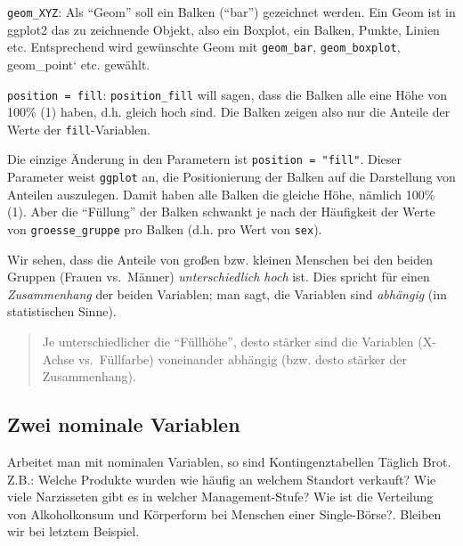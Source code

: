 \documentclass[12pt,ngerman,]{book}
\makeatletter
\newenvironment{Shaded}{\begin{snugshade}}{\end{snugshade}}
\newcommand{\KeywordTok}[1]{\textcolor[rgb]{0.13,0.29,0.53}{\textbf{{#1}}}}
\newcommand{\DataTypeTok}[1]{\textcolor[rgb]{0.13,0.29,0.53}{{#1}}}
\newcommand{\DecValTok}[1]{\textcolor[rgb]{0.00,0.00,0.81}{{#1}}}
\newcommand{\StringTok}[1]{\textcolor[rgb]{0.31,0.60,0.02}{{#1}}}
\newcommand{\NormalTok}[1]{{#1}}
\newenvironment{kframe}{%
\medskip{}
\setlength{\fboxsep}{.8em}
 \def\at@end@of@kframe{}%
 \ifinner\ifhmode%
  \def\at@end@of@kframe{\end{minipage}}%
  \begin{minipage}{\columnwidth}%
 \fi\fi%
 \def\FrameCommand##1{\hskip\@totalleftmargin \hskip-\fboxsep
 \colorbox{shadecolor}{##1}\hskip-\fboxsep
     \hskip-\linewidth \hskip-\@totalleftmargin \hskip\columnwidth}%
 \MakeFramed {\advance\hsize-\width
   \@totalleftmargin\z@ \linewidth\hsize
   \@setminipage}}%
 {\par\unskip\endMakeFramed%
 \at@end@of@kframe}
\renewenvironment{Shaded}{\begin{kframe}}{\end{kframe}}
\theoremstyle{definition}
\theoremstyle{definition}
\theoremstyle{remark}
\makeatother
\begin{document}
\texttt{geom\_XYZ}: Als ``Geom'' soll ein Balken (``bar'') gezeichnet
werden. Ein Geom ist in ggplot2 das zu zeichnende Objekt, also ein
Boxplot, ein Balken, Punkte, Linien etc. Entsprechend wird gewünschte
Geom mit \texttt{geom\_bar}, \texttt{geom\_boxplot}, geom\_point` etc.
gewählt.

\texttt{position\ =\ fill}: \texttt{position\_fill} will sagen, dass die
Balken alle eine Höhe von 100\% (1) haben, d.h. gleich hoch sind. Die
Balken zeigen also nur die Anteile der Werte der
\texttt{fill}-Variablen.

Die einzige Änderung in den Parametern ist \texttt{position\ =\ "fill"}.
Dieser Parameter weist \texttt{ggplot} an, die Positionierung der Balken
auf die Darstellung von Anteilen auszulegen. Damit haben alle Balken die
gleiche Höhe, nämlich 100\% (1). Aber die ``Füllung'' der Balken
schwankt je nach der Häufigkeit der Werte von \texttt{groesse\_gruppe}
pro Balken (d.h. pro Wert von \texttt{sex}).

Wir sehen, dass die Anteile von großen bzw. kleinen Menschen bei den
beiden Gruppen (Frauen vs.~Männer) \emph{unterschiedlich hoch} ist. Dies
spricht für einen \emph{Zusammenhang} der beiden Variablen; man sagt,
die Variablen sind \emph{abhängig} (im statistischen Sinne).

\begin{quote}
Je unterschiedlicher die ``Füllhöhe'', desto stärker sind die Variablen
(X-Achse vs.~Füllfarbe) voneinander abhängig (bzw. desto stärker der
Zusammenhang).
\end{quote}

\subsection{Zwei nominale Variablen}\label{zwei-nominale-variablen}

Arbeitet man mit nominalen Variablen, so sind Kontingenztabellen Täglich
Brot. Z.B.: Welche Produkte wurden wie häufig an welchem Standort
verkauft? Wie viele Narzisseten gibt es in welcher Management-Stufe? Wie
ist die Verteilung von Alkoholkonsum und Körperform bei Menschen einer
Single-Börse?. Bleiben wir bei letztem Beispiel.

\begin{Shaded}
\end{Shaded}
\end{document}
